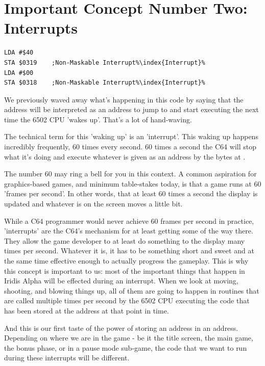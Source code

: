 \section{Important Concept Number Two: Interrupts}
\begin{lstlisting}[caption=It's an interrupt\index{interrupt}. And it's non-maskable.,escapechar=\%]
LDA #$40
STA $0319    ;Non-Maskable Interrupt%\index{Interrupt}%
LDA #$00
STA $0318    ;Non-Maskable Interrupt%\index{Interrupt}%
\end{lstlisting}

We previously waved away what's happening in this code by saying that the address  will be interpreted
as an address to jump to and start executing the next time the 6502 CPU 'wakes up'. That's a lot of hand-waving.

The technical term for this 'waking up' is an 'interrupt'. This waking up happens incredibly frequently, 60 times every second.
60 times a second the C64 will stop what it's doing and execute whatever is given as an address by the bytes at .

The number 60 may ring a bell for you in this context. A common aspiration for graphics-based games, and minimum table-stakes today,
is that a game runs at 60 'frames per second'. In other words, that at least 60 times a second the display is updated and whatever
is on the screen moves a little bit.

While a C64 programmer would never achieve 60 frames per second in practice, 'interrupts' are the C64's mechanism for at least
getting some of the way there. They allow the game developer to at least do something to the display many times per second.
Whatever it is, it has to be something short and sweet and at the same time effective enough to actually progress the gameplay.
This is why this concept is important to us: most of the important things that happen in Iridis Alpha will be effected during
an interrupt. When we look at moving, shooting, and blowing things up, all of them are going to happen in routines that are called
multiple times per second by the 6502 CPU executing the code that has been stored at the address  at that
point in time.

And this is our first taste of the power of storing an address in an address. Depending on where we are in the game - be it the
title screen, the main game, the bonus phase, or in a pause mode sub-game, the code that we want to run during these interrupts
will be different.

